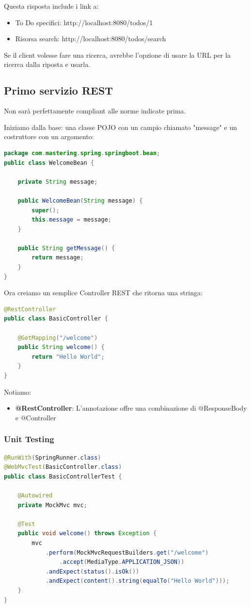 \documentclass[11pt,a4paper]{book}
\begin{document}
Questa risposta include i link a:
\begin{itemize}
	\item To Do specifici: http://localhost:8080/todos/1
	\item Risorsa search: http://localhost:8080/todos/search
\end{itemize}

Se il client volesse fare una ricerca, avrebbe l'opzione di usare la URL per la ricerca dalla riposta e usarla.

\subsection{Primo servizio REST}
Non sarà perfettamente compliant alle norme indicate prima.

Iniziamo dalla base: una classe POJO con un campio chiamato "message" e un costruttore con un argomento:
\begin{lstlisting}[language = Java]
package com.mastering.spring.springboot.bean;
public class WelcomeBean {
	
	private String message;

	public WelcomeBean(String message) {
		super();
		this.message = message;
	}

	public String getMessage() {
		return message;
	}
}
\end{lstlisting}

Ora creiamo un semplice Controller REST che ritorna una stringa:
\begin{lstlisting}[language = Java]
@RestController	
public class BasicController {

	@GetMapping("/welcome")
	public String welcome() {
		return "Hello World";
	}
}
\end{lstlisting}

Notiamo: 
\begin{itemize}
	\item \textbf{@RestController}: L'annotazione offre una combinazione di @ResponseBody e @Controller
\end{itemize}

\subsubsection{Unit Testing}
\begin{lstlisting}[language = Java]
@RunWith(SpringRunner.class)
@WebMvcTest(BasicController.class)
public class BasicControllerTest {
	
	@Autowired
	private MockMvc mvc;

	@Test
	public void welcome() throws Exception {
		mvc
			.perform(MockMvcRequestBuilders.get("/welcome")
				.accept(MediaType.APPLICATION_JSON))
			.andExpect(status().isOk())
			.andExpect(content().string(equalTo("Hello World")));
	}
}
\end{lstlisting}
\end{document}
